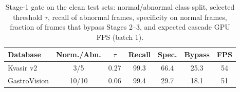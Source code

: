 \begin{table}[t]
\caption{Stage-1 gate on the clean test sets: normal/abnormal class split, selected threshold $\tau$, recall of
abnormal frames, specificity on normal frames, fraction of frames that bypass Stages 2--3, and expected cascade GPU FPS (batch 1).}
\label{tab:gate}\centering\setlength{\tabcolsep}{3pt}
\begin{tabular}{lcccccc}\toprule
Database & Norm./Abn. & $\tau$ & Recall & Spec. & Bypass & FPS\\\midrule
Kvasir v2 & 3/5 & 0.27 & 99.3 & 66.4 & 25.3 & 54\\
GastroVision & 10/10 & 0.06 & 99.4 & 29.7 & 18.1 & 51\\
\bottomrule\end{tabular}\end{table}
